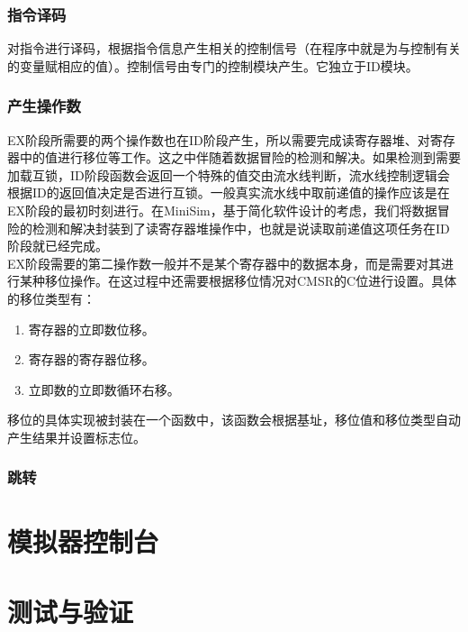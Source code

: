 \documentclass[12pt,a4paper,Flow]{report}
\begin{document}
\subsection{指令译码}
对指令进行译码，根据指令信息产生相关的控制信号（在程序中就是为与控制有关的变量赋相应的值）。控制信号由专门的控制模块产生。它独立于ID模块。
\subsection{产生操作数}
EX阶段所需要的两个操作数也在ID阶段产生，所以需要完成读寄存器堆、对寄存器中的值进行移位等工作。这之中伴随着数据冒险的检测和解决。如果检测到需要加载互锁，ID阶段函数会返回一个特殊的值交由流水线判断，流水线控制逻辑会根据ID的返回值决定是否进行互锁。一般真实流水线中取前递值的操作应该是在EX阶段的最初时刻进行。在MiniSim，基于简化软件设计的考虑，我们将数据冒险的检测和解决封装到了读寄存器堆操作中，也就是说读取前递值这项任务在ID阶段就已经完成。\\
\indent EX阶段需要的第二操作数一般并不是某个寄存器中的数据本身，而是需要对其进行某种移位操作。在这过程中还需要根据移位情况对CMSR的C位进行设置。具体的移位类型有：
\begin{enumerate}
\item 寄存器的立即数位移。
\item 寄存器的寄存器位移。
\item 立即数的立即数循环右移。
\end{enumerate}
移位的具体实现被封装在一个函数中，该函数会根据基址，移位值和移位类型自动产生结果并设置标志位。
\subsection{跳转}
\chapter{模拟器控制台}

\chapter{测试与验证}
\end{document}
